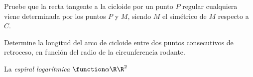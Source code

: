 \begin{ejercicio} Pruebe que la recta tangente a la cicloide por un punto $P$ regular cualquiera viene determinada por los puntos $P$ y $M$, siendo $M$ el simétrico de $M$ respecto a $C$.
\end{ejercicio}

\begin{ejercicio} Determine la longitud del arco de cicloide entre dos puntos consecutivos de retroceso, en
función del radio de la circunferencia rodante.
\end{ejercicio}

\begin{ejercicio} La \textit{espiral logarítmica} $\function\alpha{\R}{\R^2}$ 
\end{ejercicio}